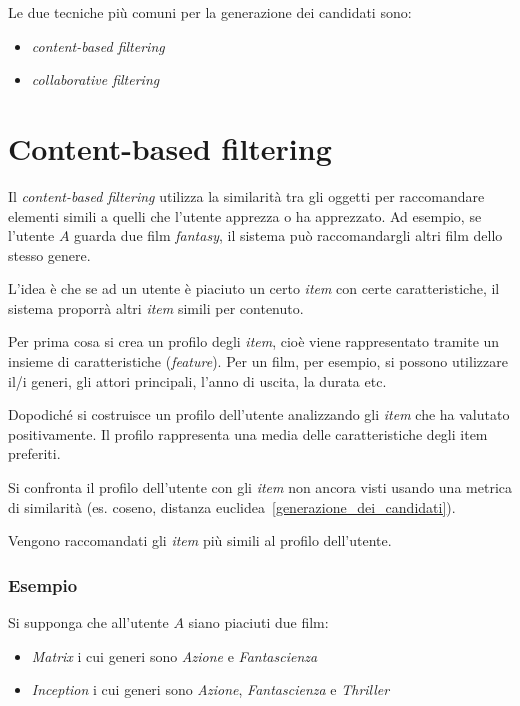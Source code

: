 Le due tecniche più comuni per la generazione dei candidati sono:

\begin{itemize}
    \item \textit{content-based filtering}
    \item \textit{collaborative filtering}
\end{itemize}
  
\section{Content-based filtering}
Il \textit{content-based filtering} utilizza la similarità tra gli oggetti per raccomandare elementi simili a quelli che l'utente apprezza o ha apprezzato. Ad esempio, se l'utente $A$ guarda due film \textit{fantasy}, il sistema può raccomandargli altri film dello stesso genere.

L'idea è che se ad un utente è piaciuto un certo \textit{item} con certe caratteristiche, il sistema proporrà altri \textit{item} simili per contenuto.

Per prima cosa si crea un profilo degli \textit{item}, cioè viene rappresentato tramite un insieme di caratteristiche (\textit{feature}). Per un film, per esempio, si possono utilizzare il/i generi, gli attori principali, l'anno di uscita, la durata etc.

Dopodiché si costruisce un profilo dell'utente analizzando gli \textit{item} che ha valutato positivamente. Il profilo rappresenta una media delle caratteristiche degli {item} preferiti.

Si confronta il profilo dell'utente con gli \textit{item} non ancora visti usando una metrica di similarità (es. coseno, distanza euclidea~\ref{generazione_dei_candidati}).

Vengono raccomandati gli \textit{item} più simili al profilo dell'utente.

\subsubsection{Esempio}

Si supponga che all'utente $A$ siano piaciuti due film:

\begin{itemize}
    \item \textit{Matrix} i cui generi sono \textit{Azione} e \textit{Fantascienza}
    \item \textit{Inception} i cui generi sono \textit{Azione}, \textit{Fantascienza} e \textit{Thriller}
\end{itemize}

